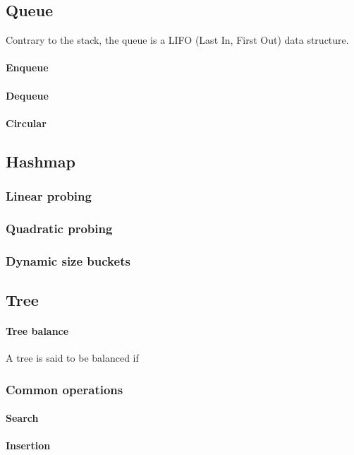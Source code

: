 \documentclass{article}
\begin{document}
\subsection{Queue}
Contrary to the stack, the queue is a LIFO (Last In, First Out) data structure.

\paragraph{Enqueue}
\paragraph{Dequeue}
\paragraph{Circular}

\newpage

\subsection{Hashmap}
\subsubsection{Linear probing}
\subsubsection{Quadratic probing}
\subsubsection{Dynamic size buckets}

\newpage

\subsection{Tree}
\paragraph{Tree balance}
A tree is said to be balanced if 


\subsubsection{Common operations}
\paragraph{Search}
\paragraph{Insertion}
\end{document}
